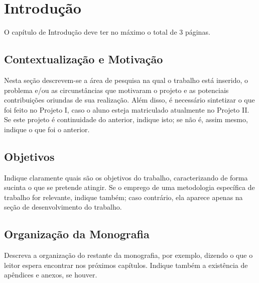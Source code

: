 \chapter{Introdução}

O capítulo de Introdução deve ter no máximo o total de 3 páginas.

\section{Contextualização e Motivação}
\label{sec:context}
Nesta seção  descrevem-se a área de  pesquisa na qual o  trabalho está
inserido, o problema e/ou as  circunstâncias que motivaram o projeto e
as potenciais contribuições oriundas de  sua realização. Além disso, é
necessário  sintetizar o  que foi  feito no  Projeto I,  caso o  aluno
esteja  matriculado  atualmente  no  Projeto II.  Se  este  projeto  é
continuidade do anterior, indique isto; se não é, assim mesmo, indique
o que foi o anterior.



\section{Objetivos}
Indique claramente quais são  os objetivos do trabalho, caracterizando
de  forma sucinta  o que  se  pretende atingir.  Se o  emprego de  uma
metodologia específica de trabalho for relevante, indique também; caso
contrário, ela aparece apenas na seção de desenvolvimento do trabalho.


\section{Organização da Monografia}
Descreva a organização do restante da monografia, por exemplo, dizendo
o que o leitor espera encontrar nos próximos capítulos. Indique também
a existência de apêndices e anexos, se houver.



